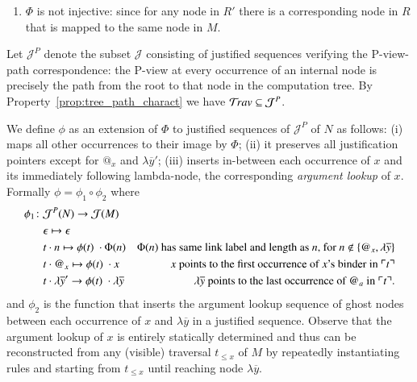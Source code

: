 \documentclass{elsarticle}
\theoremstyle{plain}
\theoremstyle{definition}
\theoremstyle{remark}
\def\justseqset{\mathcal{J}}
\begin{document}
\begin{description}[itemindent=0em,leftmargin=0cm]
\begin{enumerate}[label=(\roman*)]
    \item $\Phi$ is not injective: since for any node in $R'$ there is a corresponding node in $R$ that is mapped to the same node in $M$.
\end{enumerate}

Let $\justseqset^P$ denote the subset $\justseqset$
consisting of justified sequences verifying the P-view-path correspondence:
the P-view at every occurrence of an internal node is precisely the path from the root to that node in the computation tree. By Property~\ref{prop:tree_path_charact} we have $\travset \subseteq \justseqset^P$.

We define $\phi$ as an extension of $\Phi$ to justified sequences of $\justseqset^P$ of $N$ as follows:
(i) maps all other occurrences to their image by $\Phi$;
(ii) it preserves all justification pointers except for $@_x$ and $\lambda\overline{y}'$;
(iii) inserts in-between each occurrence of $x$ and its immediately following lambda-node, the corresponding \emph{argument lookup} of $x$. Formally $\phi = \phi_1 \circ \phi_2$ where
\begin{align*}
\phi_1 \colon & \justseqset^P(N) \rightarrow \justseqset(M) \\
& \epsilon \mapsto \epsilon  \\
& t \cdot n \mapsto \phi(t) \ \cdot \Phi(n) &\mbox{$\Phi(n)$ has same link label and length as $n$, for $n\not\in \{ @_x, \lambda\overline{y} \}$}\\
 & t \cdot @_x \mapsto \phi(t) \ \cdot x &\mbox{$x$ points to the first occurrence of $x$'s binder in $\pview{t}$} \\
& t \cdot \lambda\overline{y}' \rightarrow \phi(t) \ \cdot \lambda\overline{y} &\mbox{$\lambda\overline{y}$ points to the last occurrence of $@_a$ in $\pview{t}$.}
\end{align*}
and $\phi_2$ is the function that inserts the argument lookup sequence of ghost nodes between each occurrence of $x$ and $\lambda\overline{y}$ in a justified sequence. Observe that the argument lookup of $x$ is entirely statically determined and thus can be reconstructed from any (visible) traversal $t_{\leq x}$ of $M$ by repeatedly instantiating rules  and  starting from $t_{\leq x}$ until reaching node $\lambda\overline{y}$.


\end{description}
\end{document}
